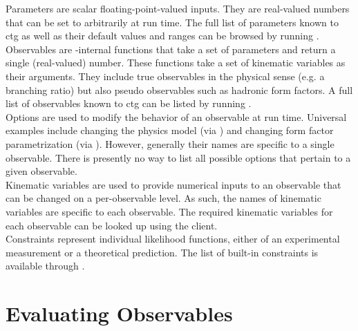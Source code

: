 Parameters are scalar floating-point-valued inputs. They are real-valued
numbers that can be set to arbitrarily at run time.  The full list of
parameters known to ctg as well as their default values and ranges can be browsed
by running .\\

Observables are \ctg-internal functions that take a set of parameters and return a single
(real-valued) number. These functions take a set of kinematic variables as their arguments.
They include true observables in the physical sense (e.g.
a branching ratio) but also pseudo observables such as hadronic form factors.
A full list of observables known to ctg can be listed by running
.\\

Options are used to modify the behavior of an observable at run time.
Universal examples include changing the physics model (via ) and
changing form factor parametrization (via ). However,
generally their names are specific to a single observable. There is presently
no way to list all possible options that pertain to a given observable.\\

Kinematic variables are used to provide numerical inputs to an observable that can
be changed on a per-observable level. As such, the names of kinematic variables are
specific to each observable. The required kinematic variables for each observable
can be looked up using the  client.\\

Constraints represent individual likelihood functions, either of
an experimental measurement or a theoretical prediction. The list of built-in
constraints is available through .


\section{Evaluating Observables}
\label{sec:usage:ctg-evaluate}


